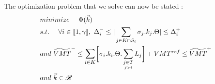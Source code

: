 The optimization problem that we solve can now be stated :\\
\begin{align}
	&minimize\ \ \ \ \Phi(\vec{k}) \\
	&s.t.\ \ \ \ 	\forall i\in \llbracket 1,\gamma \rrbracket,\ \Delta_{i}^{-}\leq |\sum\limits_{j\in K\cap S_{i}}\sigma_{j}.k_{j}.\Theta| \leq \Delta_{i}^{+} \nonumber\\
	&and\ \widetilde{VMT}^{-}\leq\mathlarger{\sum\limits_{i\in K}}\biggl[\sigma_{i}.k_{i}.\Theta.	\sum\limits_{\underset{j>i}{j\in T}}L_{j}\biggr]+VMT^{ref}\leq \widetilde{VMT}^{+}\nonumber \\	
	&and\ \vec{k} \in \mathscr{B} \nonumber
\end{align}
